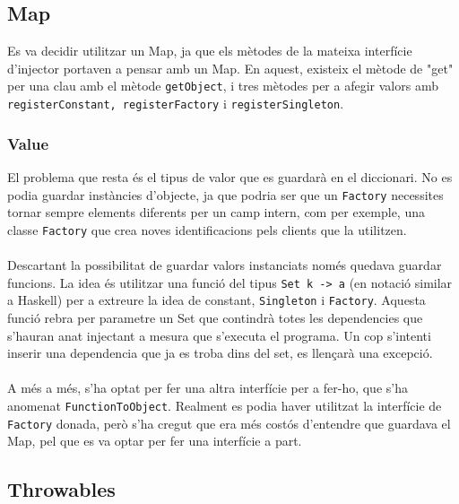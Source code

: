 
\subsection{Map}
Es va decidir utilitzar un Map, ja que els mètodes de la mateixa interfície d'injector portaven a pensar amb un Map. En aquest, existeix
el mètode de "get" per una clau amb el mètode \texttt{getObject}, i tres mètodes per a afegir valors 
amb \texttt{registerConstant, registerFactory} i \texttt{registerSingleton}. 
\subsubsection{Value}
El problema que resta és el tipus de valor que es guardarà en el diccionari. No es podia guardar instàncies d'objecte, ja que podria
ser que un \texttt{Factory} necessites tornar sempre elements diferents per un camp intern, com per exemple, una classe
\texttt{Factory} que crea noves identificacions pels clients que la utilitzen.\\
\\
Descartant la possibilitat de guardar valors instanciats només quedava guardar funcions. La idea és utilitzar una
funció del tipus \texttt{Set k -> a} (en notació similar a Haskell) per a extreure
la idea de constant, \texttt{Singleton} i \texttt{Factory}. Aquesta funció rebra per parametre un Set que contindrà totes les dependencies que s'hauran anat injectant a mesura que s'executa el programa. Un cop s'intenti inserir una dependencia que ja es troba dins del set, es llençarà una excepció.\\
\\
A més a més, s'ha optat per fer una altra interfície per a fer-ho, que s'ha anomenat \texttt{FunctionToObject}. Realment
es podia haver utilitzat la interfície de \texttt{Factory} donada, però s'ha cregut que era més costós d'entendre que 
guardava el Map, pel que es va optar per fer una interfície a part.
\subsection{Throwables}
